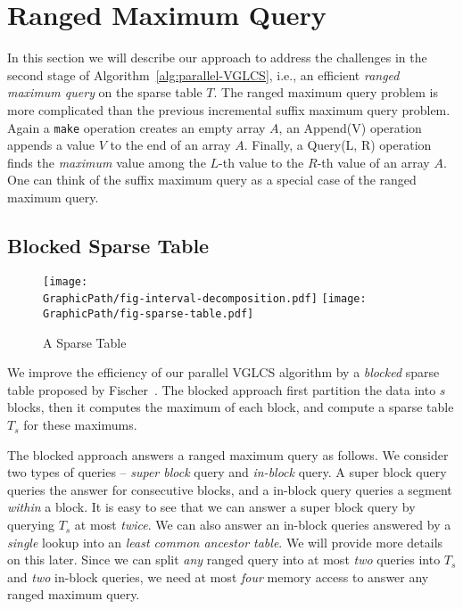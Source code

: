 \section{Ranged Maximum Query} \label{sec:parallelRMQ}

In this section we will describe our approach to address the
challenges in the second stage of Algorithm~\ref{alg:parallel-VGLCS},
i.e., an efficient {\em ranged maximum query} on the sparse table $T$.
The ranged maximum query problem is more complicated than the previous
incremental suffix maximum query problem.  Again a {\tt make}
operation creates an empty array $A$, an {\sc Append(V)} operation
appends a value $V$ to the end of an array $A$.  Finally, a {\sc
  Query(L, R)} operation finds the {\em maximum} value among the
$L$-th value to the $R$-th value of an array $A$.  One can think of
the suffix maximum query as a special case of the ranged maximum
query.


\subsection{Blocked Sparse Table}

\begin{figure}[!thb]
  \centering 
    \texttt{[image: \\GraphicPath/fig-interval-decomposition.pdf]}
    \texttt{[image: \\GraphicPath/fig-sparse-table.pdf]}
  \caption{A Sparse Table}
  \label{fig:block-interval-decomposition}
\end{figure}

We improve the efficiency of our parallel VGLCS algorithm by a {\em
  blocked} sparse table proposed by
Fischer~\cite{Fischer2006TheoreticalAP}.  The blocked approach first
partition the data into $s$ blocks, then it computes the maximum of
each block, and compute a sparse table $T_s$ for these maximums.

The blocked approach answers a ranged maximum query as follows.  We
consider two types of queries -- {\em super block} query and {\em
  in-block} query.  A super block query queries the answer for
consecutive blocks, and a in-block query queries a segment {\em
  within} a block.  It is easy to see that we can answer a super block
query by querying $T_s$ at most {\em twice}.  We can also answer an
in-block queries answered by a {\em single} lookup into an {\em least
  common ancestor table}.  We will provide more details on this later.
Since we can split {\em any} ranged query into at most {\em two}
queries into $T_s$ and {\em two} in-block queries, we need at most
{\em four} memory access to answer any ranged maximum query.

